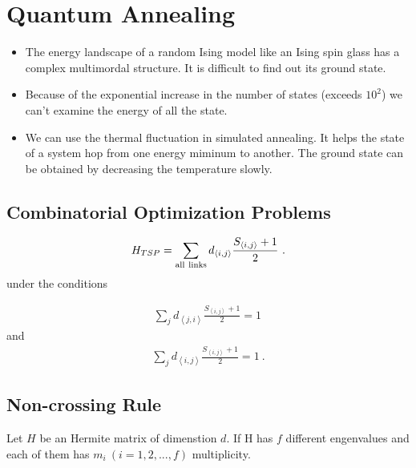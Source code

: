 \documentclass[a4j,11pt]{jarticle}
\begin{document}
\section{Quantum Annealing}
\begin{itemize}
  \item The energy landscape of a random Ising model like an Ising spin glass has a complex multimordal structure. It is difficult to find out its ground state.
  \item Because of the exponential increase in the number of states (exceeds $10^2$) we can't examine the energy of all the state.
  \item We can use the thermal fluctuation in simulated annealing. It helps the state of a system hop from one energy miminum to another. The ground state can be obtained by decreasing the temperature slowly.
\end{itemize}

\subsection{Combinatorial Optimization Problems}

\begin{eqnarray}
  H_{TSP} = \sum_{{\rm all \ links}} d_{\left <i, j \right >} \frac{S_{\left < i, j \right >} + 1}{2} \ .
\end{eqnarray}
under the conditions

\begin{eqnarray}
 \sum_{j} d_{\left <j, i \right >} \frac{S_{\left < i, j \right >} + 1}{2} = 1 \,
\end{eqnarray}
and
\begin{eqnarray}
 \sum_{j} d_{\left <i, j \right >} \frac{S_{\left < i, j \right >} + 1}{2} = 1 \ .
\end{eqnarray}

\subsection{Non-crossing Rule}

Let $H$ be an Hermite matrix of dimenstion $d$. If H has $f$ different engenvalues and each of them has $m_i \ (i = 1, 2, ..., f)$  multiplicity.
\end{document}
